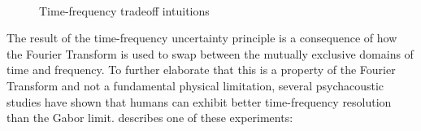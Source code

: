\documentclass[report.tex]{subfiles}
\begin{document}
\begin{figure}[ht]
	\centering
	\\
	\caption{Time-frequency tradeoff intuitions \parencite[103, 106]{gabor2}}
	\label{fig:gaborfirst}
\end{figure}

The result of the time-frequency uncertainty principle is a consequence of how the Fourier Transform is used to swap between the mutually exclusive domains of time and frequency. To further elaborate that this is a property of the Fourier Transform and not a fundamental physical limitation, several psychacoustic studies have shown that humans can exhibit better time-frequency resolution than the Gabor limit. \citeauthor{psycho2} describes one of these experiments:
\end{document}
